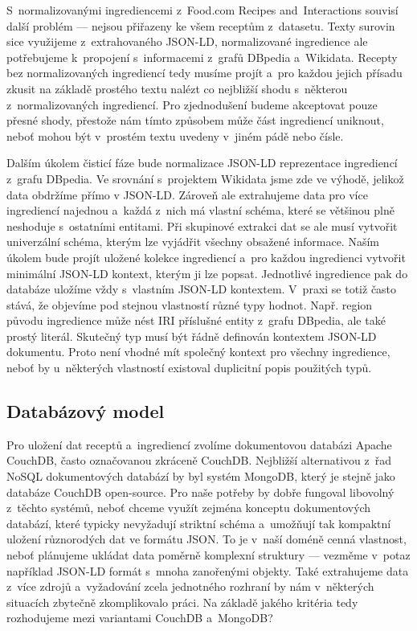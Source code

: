 S~normalizovanými ingrediencemi z~Food.com Recipes and~Interactions souvisí další problém --- nejsou přiřazeny ke všem receptům z~datasetu. Texty surovin sice využijeme z~extrahovaného JSON-LD, normalizované ingredience ale potřebujeme k~propojení s~informacemi z~grafů DBpedia a~Wikidata. Recepty bez normalizovaných ingrediencí tedy musíme projít a~pro každou jejich přísadu zkusit na základě prostého textu nalézt co nejbližší shodu s~některou z~normalizovaných ingrediencí. Pro zjednodušení budeme akceptovat pouze přesné shody, přestože nám tímto způsobem může část ingrediencí uniknout, neboť mohou být v~prostém textu uvedeny v~jiném pádě nebo čísle.

Dalším úkolem čisticí fáze bude normalizace JSON-LD reprezentace ingrediencí z~grafu DBpedia. Ve srovnání s~projektem Wikidata jsme zde ve výhodě, jelikož data obdržíme přímo v JSON-LD. Zároveň ale extrahujeme data pro více ingrediencí najednou a~každá z~nich má vlastní schéma, které se většinou plně neshoduje s~ostatními entitami. Při skupinové extrakci dat se ale musí vytvořit univerzální schéma, kterým lze vyjádřit všechny obsažené informace. Naším úkolem bude projít uložené kolekce ingrediencí a~pro každou ingredienci vytvořit minimální JSON-LD kontext, kterým ji lze popsat. Jednotlivé ingredience pak do databáze uložíme vždy s~vlastním JSON-LD kontextem. V~praxi se totiž často stává, že objevíme pod stejnou vlastností různé typy hodnot. Např. region původu ingredience může nést IRI příslušné entity z~grafu DBpedia, ale také prostý literál. Skutečný typ musí být řádně definován kontextem JSON-LD dokumentu. Proto není vhodné mít společný kontext pro všechny ingredience, neboť by u~některých vlastností existoval duplicitní popis použitých typů.

\subsection{Databázový model}

Pro uložení dat receptů a~ingrediencí zvolíme dokumentovou databázi Apache CouchDB, často označovanou zkráceně CouchDB. Nejbližší alternativou z~řad NoSQL dokumentových databází by byl systém MongoDB, který je stejně jako databáze CouchDB open-source. Pro naše potřeby by dobře fungoval libovolný z~těchto systémů, neboť chceme využít zejména konceptu dokumentových databází, které typicky nevyžadují striktní schéma a~umožňují tak kompaktní uložení různorodých dat ve formátu JSON. To je v~naší doméně cenná vlastnost, neboť plánujeme ukládat data poměrně komplexní struktury --- vezměme v~potaz například JSON-LD formát s~mnoha zanořenými objekty. Také extrahujeme data z~více zdrojů a~vyžadování zcela jednotného rozhraní by nám v~některých situacích zbytečně zkomplikovalo práci. Na základě jakého kritéria tedy rozhodujeme mezi variantami CouchDB a~MongoDB?

